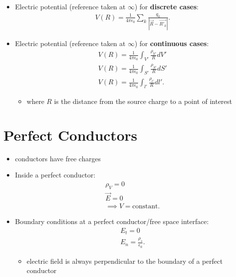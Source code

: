 \documentclass[10pt]{article}
\begin{document}
\begin{itemize}
    \item Electric potential (reference taken at $\infty$) for \textbf{discrete cases}:
        \begin{align*}
            V(R) = \frac{1}{4\pi \epsilon_0} \sum_{k} \frac{q_k}{|\vec{R}-\vec{R'_k}|}
        .\end{align*}
    \item Electric potential (reference taken at $\infty$) for \textbf{continuous cases}:
        \begin{align*}
            V(R) = \frac{1}{4\pi \epsilon_0} \int_{V'} \frac{\rho_{V'}}{R} dV' \\ 
            V(R) = \frac{1}{4\pi \epsilon_0} \int_{S'} \frac{\rho_{S'}}{R} dS' \\ 
            V(R) = \frac{1}{4\pi \epsilon_0} \int_{l'} \frac{\rho_{l'}}{R} dl'  
        .\end{align*}
        \begin{itemize}
            \item where $R$ is the distance from the source charge to a point of interest
        \end{itemize}
\end{itemize}



\section{Perfect Conductors}
\begin{itemize}
    \item conductors have free charges
    \item Inside a perfect conductor:
        \begin{gather*}
            \rho_V = 0 \\ 
            \vec{E} = 0 \\ 
            \implies V = \text{constant}
        .\end{gather*}
    \item Boundary conditions at a perfect conductor/free space interface:
        \begin{gather*}
            E_t = 0 \\ 
            E_n = \frac{\rho_s}{\epsilon_0}
        .\end{gather*}
        \begin{itemize}
            \item electric field is always perpendicular to the boundary of a perfect conductor
        \end{itemize}
\end{itemize}
\end{document}
